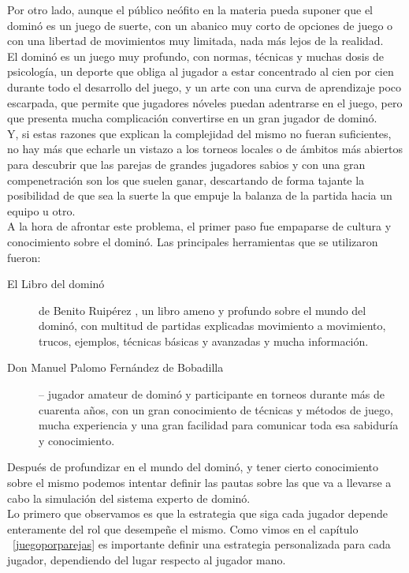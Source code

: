 Por otro lado, aunque el público neófito en la materia pueda suponer que el dominó es un juego de suerte, con un
abanico muy corto de opciones de juego o con una libertad de movimientos muy limitada, nada más lejos de la realidad. \\

El dominó es un juego muy profundo, con normas, técnicas y muchas dosis de psicología, un deporte que obliga al
jugador a estar concentrado al cien por cien durante todo el desarrollo del juego, y un arte con una curva de
aprendizaje poco escarpada, que permite que jugadores nóveles puedan adentrarse en el juego, pero que presenta
mucha complicación convertirse en un gran jugador de dominó. \\

Y, si estas razones que explican la complejidad del mismo no fueran suficientes, no hay más que echarle un vistazo
a los torneos locales o de ámbitos más abiertos para descubrir que las parejas de grandes jugadores sabios y con
una gran compenetración son los que suelen ganar, descartando de forma tajante la posibilidad de que sea la suerte
la que empuje la balanza de la partida hacia un equipo u otro. \\

A la hora de afrontar este problema, el primer paso fue empaparse de cultura y conocimiento sobre el dominó. Las
principales herramientas que se utilizaron fueron:

\begin{description}
    \item[El Libro del dominó] de Benito Ruipérez \cite{mora90}, un libro ameno y profundo sobre el mundo del dominó,
        con multitud de partidas explicadas movimiento a movimiento, trucos, ejemplos, técnicas básicas y avanzadas y
        mucha información.
    \item[Don Manuel Palomo Fernández de Bobadilla] -- jugador amateur de dominó y participante en torneos durante más de cuarenta
        años, con un gran conocimiento de técnicas y métodos de juego, mucha experiencia y una gran facilidad para
        comunicar toda esa sabiduría y conocimiento.
\end{description}

Después de profundizar en el mundo del dominó, y tener cierto conocimiento sobre el mismo podemos intentar definir las pautas sobre
las que va a llevarse a cabo la simulación del sistema experto de dominó. \\

Lo primero que observamos es que la estrategia que siga cada jugador depende enteramente del rol que desempeñe el mismo.
Como vimos en el capítulo ~\ref{juegoporparejas} es importante definir una estrategia personalizada para cada jugador,
dependiendo del lugar respecto al jugador mano. \\

